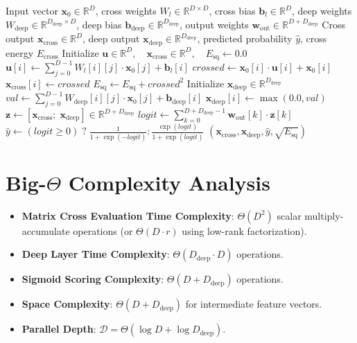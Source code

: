 \documentclass[11pt,a4paper]{article}
\theoremstyle{definition}
\begin{document}
\begin{algorithm}[H]
\caption{Deep \& Cross Network v2 (DCN-v2) Forward Evaluation}
\begin{algorithmic}[1]
\Require Input vector $\mathbf{x}_0 \in \mathbb{R}^D$, cross weights $W_l \in \mathbb{R}^{D \times D}$, cross bias $\mathbf{b}_l \in \mathbb{R}^D$, deep weights $W_{\text{deep}} \in \mathbb{R}^{D_{\text{deep}} \times D}$, deep bias $\mathbf{b}_{\text{deep}} \in \mathbb{R}^{D_{\text{deep}}}$, output weights $\mathbf{w}_{\text{out}} \in \mathbb{R}^{D + D_{\text{deep}}}$
\Ensure Cross output $\mathbf{x}_{\text{cross}} \in \mathbb{R}^D$, deep output $\mathbf{x}_{\text{deep}} \in \mathbb{R}^{D_{\text{deep}}}$, predicted probability $\widehat{y}$, cross energy $E_{\text{cross}}$
\State Initialize $\mathbf{u} \in \mathbb{R}^D, \quad \mathbf{x}_{\text{cross}} \in \mathbb{R}^D, \quad E_{\text{sq}} \gets 0.0$
 
    \State $\mathbf{u}[i] \gets \sum_{j=0}^{D-1} W_l[i][j] \cdot \mathbf{x}_0[j] + \mathbf{b}_l[i]$
    \State $crossed \gets \mathbf{x}_0[i] \cdot \mathbf{u}[i] + \mathbf{x}_0[i]$
    \State $\mathbf{x}_{\text{cross}}[i] \gets crossed$
    \State $E_{\text{sq}} \gets E_{\text{sq}} + crossed^2$
\EndFor
\State Initialize $\mathbf{x}_{\text{deep}} \in \mathbb{R}^{D_{\text{deep}}}$
 
    \State $val \gets \sum_{j=0}^{D-1} W_{\text{deep}}[i][j] \cdot \mathbf{x}_0[j] + \mathbf{b}_{\text{deep}}[i]$
    \State $\mathbf{x}_{\text{deep}}[i] \gets \max(0.0, val)$
\EndFor
\State $\mathbf{z} \gets [\mathbf{x}_{\text{cross}}; \; \mathbf{x}_{\text{deep}}] \in \mathbb{R}^{D + D_{\text{deep}}}$
\State $logit \gets \sum_{k=0}^{D + D_{\text{deep}}-1} \mathbf{w}_{\text{out}}[k] \cdot \mathbf{z}[k]$ 
\State $\widehat{y} \gets (logit \ge 0) \;?\; \frac{1}{1 + \exp(-logit)} : \frac{\exp(logit)}{1 + \exp(logit)}$
\State \Return $(\mathbf{x}_{\text{cross}}, \mathbf{x}_{\text{deep}}, \widehat{y}, \sqrt{E_{\text{sq}}})$
\end{algorithmic}
\end{algorithm}

\section{Big-$\Theta$ Complexity Analysis}

\begin{itemize}
    \item \textbf{Matrix Cross Evaluation Time Complexity}: $\Theta(D^2)$ scalar multiply-accumulate operations (or $\Theta(D \cdot r)$ using low-rank factorization).
    \item \textbf{Deep Layer Time Complexity}: $\Theta(D_{\text{deep}} \cdot D)$ operations.
    \item \textbf{Sigmoid Scoring Complexity}: $\Theta(D + D_{\text{deep}})$ operations.
    \item \textbf{Space Complexity}: $\Theta(D + D_{\text{deep}})$ for intermediate feature vectors.
    \item \textbf{Parallel Depth}: $\mathcal{D} = \Theta(\log D + \log D_{\text{deep}})$.
\end{itemize}
\end{document}
